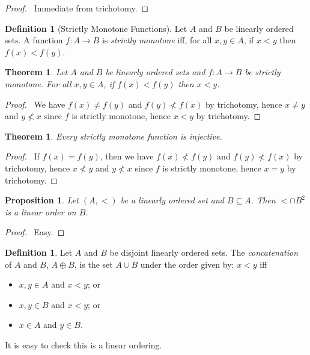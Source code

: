 \documentclass{article}
\let\qed\relax
\newtheorem{proposition}[axiom]{Proposition}
\newtheorem{theorem}[axiom]{Theorem}
\theoremstyle{definition}
\newtheorem{definition}[axiom]{Definition}
\begin{document}
    \begin{proof}
        \pf\ Immediate from trichotomy. \qed
    \end{proof}

    \begin{definition}[Strictly Monotone Functions]
        Let $A$ and $B$ be linearly ordered sets. A function $f : A \rightarrow B$ is \emph{strictly
        monotone} iff, for all $x, y \in A$, if $x < y$ then $f(x) < f(y)$.
    \end{definition}

    \begin{theorem}
        Let $A$ and $B$ be linearly ordered sets and $f : A \rightarrow B$ be strictly monotone.
        For all $x, y \in A$, if $f(x) < f(y)$ then $x < y$.
    \end{theorem}

    \begin{proof}
        \pf\ We have $f(x) \neq f(y)$ and $f(y) \not < f(x)$ by trichotomy, hence $x \neq y$ and $y \not < x$
        since $f$ is strictly monotone, hence $x < y$ by trichotomy. \qed
    \end{proof}

    \begin{theorem}
        Every strictly monotone function is injective.
    \end{theorem}

    \begin{proof}
        \pf\ If $f(x) = f(y)$, then we have $f(x) \not < f(y)$ and $f(y) \not < f(x)$ by trichotomy,
        hence $x \not < y$ and $y \not < x$ since $f$ is strictly monotone, hence $x = y$ by
        trichotomy. \qed
    \end{proof}

    \begin{proposition}
        Let $(A, <)$ be a linearly ordered set and $B \subseteq A$. Then $< \cap B^2$ is a linear order on $B$.
    \end{proposition}

    \begin{proof}
        \pf\ Easy. \qed
    \end{proof}

    \begin{definition}
        Let $A$ and $B$ be disjoint linearly ordered sets. The \emph{concatenation} of $A$ and $B$,
        $A \oplus B$, is the set $A \cup B$ under the order given by: $x < y$ iff
        \begin{itemize}
            \item $x, y \in A$ and $x < y$; or
            \item $x, y \in B$ and $x < y$; or
            \item $x \in A$ and $y \in B$.
        \end{itemize}

        It is easy to check this is a linear ordering.
    \end{definition}
\end{document}
